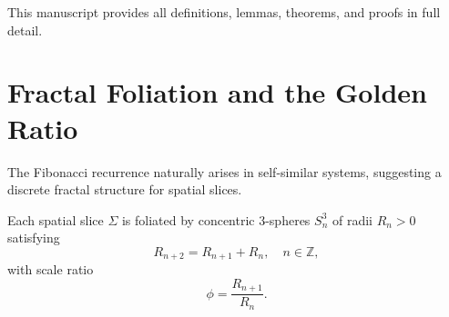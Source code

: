 \documentclass[
  prd,
  aps,
  twocolumn,
  superscriptaddress,
  nofootinbib,
  longbibliography
]{revtex4-2}
\newcommand{\vp}{\phi}
\begin{document}
This manuscript provides all definitions, lemmas, theorems, and proofs in full detail.

\section{Fractal Foliation and the Golden Ratio}\label{sec:foliation}

The Fibonacci recurrence naturally arises in self-similar systems, suggesting a discrete fractal structure for spatial slices.

\begin{definition}
Each spatial slice \(\Sigma\) is foliated by concentric 3-spheres \( S^3_n \) of radii \( R_n > 0 \) satisfying
\[
  R_{n+2} = R_{n+1} + R_n, \quad n \in \mathbb{Z},
\]
with scale ratio
\[
  \vp = \frac{R_{n+1}}{R_n}.
\]
\end{definition}
\end{document}
